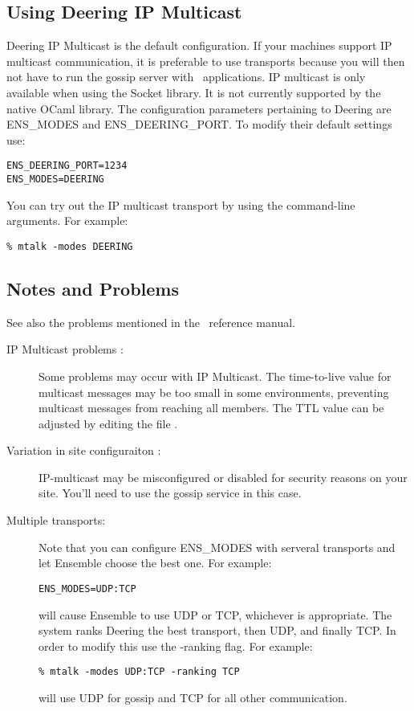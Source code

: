 \subsection{Using Deering IP Multicast}
Deering IP Multicast is the default configuration. If your machines support IP
multicast communication, it is preferable to use 
transports because you will then not have to run the gossip server
with \ensemble\ applications. IP multicast is only available
when using the Socket library. It is not currently supported
by the native OCaml library. The configuration parameters pertaining
to Deering are ENS\_MODES and ENS\_DEERING\_PORT. To modify their
default settings use:
\begin{verbatim}
ENS_DEERING_PORT=1234
ENS_MODES=DEERING
\end{verbatim}
 
You can try out the IP multicast transport by using the command-line arguments.  
For example: 
\begin{verbatim}
% mtalk -modes DEERING
\end{verbatim}

\subsection{Notes and Problems}

See also the problems mentioned in the \ensemble\ reference manual.
\begin{description}
\item
[IP Multicast problems :] Some problems may occur with IP Multicast.
The time-to-live value for multicast messages may be too small in
some environments, preventing multicast messages from reaching all
members. The TTL value can be adjusted by editing the file \newline
{}.
\item
[Variation in site configuraiton :]
IP-multicast may be misconfigured or disabled for security reasons on
your site. You'll need to use the gossip service in this case. 
\item
[Multiple transports:]
Note that you can configure ENS\_MODES with serveral transports and let
Ensemble choose the best one. For example: 
\begin{verbatim}
ENS_MODES=UDP:TCP
\end{verbatim}
will cause Ensemble to use UDP or TCP, whichever is appropriate. The
system ranks Deering the best transport, then UDP, and finally TCP. In
order to modify this use the -ranking flag. For example: 
\begin{verbatim}
% mtalk -modes UDP:TCP -ranking TCP
\end{verbatim}
will use UDP for gossip and TCP for all other communication. 
\end{description}


